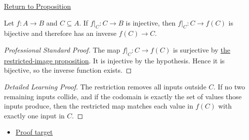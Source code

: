 \newpage
{}
\label{prf:injective-restriction-local-inverse}

\begin{remark*}[Return]
\hyperref[prop:injective-restriction-local-inverse]{Return to Proposition}
\end{remark*}

\begin{proposition*}
Let $f:A\to B$ and $C\subseteq A$. If $f|_C:C\to B$ is injective, then
$f|_C:C\to f(C)$ is bijective and therefore has an inverse $f(C)\to C$.
\end{proposition*}

\begin{proof}[Professional Standard Proof]
\LRAProofBodyStart
The map $f|_C:C\to f(C)$ is surjective by
\hyperref[prop:restricted-map-onto-image]{the restricted-image proposition}.
It is injective by the hypothesis. Hence it is bijective, so the inverse
function exists.
\end{proof}

\begin{proof}[Detailed Learning Proof]
\LRAProofBodyStart
The restriction removes all inputs outside $C$. If no two remaining inputs
collide, and if the codomain is exactly the set of values those inputs produce,
then the restricted map matches each value in $f(C)$ with exactly one input in
$C$.
\end{proof}
\begin{remark*}
\end{remark*}



\begin{dependencies}
\begin{itemize}
  \item \hyperref[prop:injective-restriction-local-inverse]{Proof target}
\end{itemize}
\end{dependencies}

\clearpage

